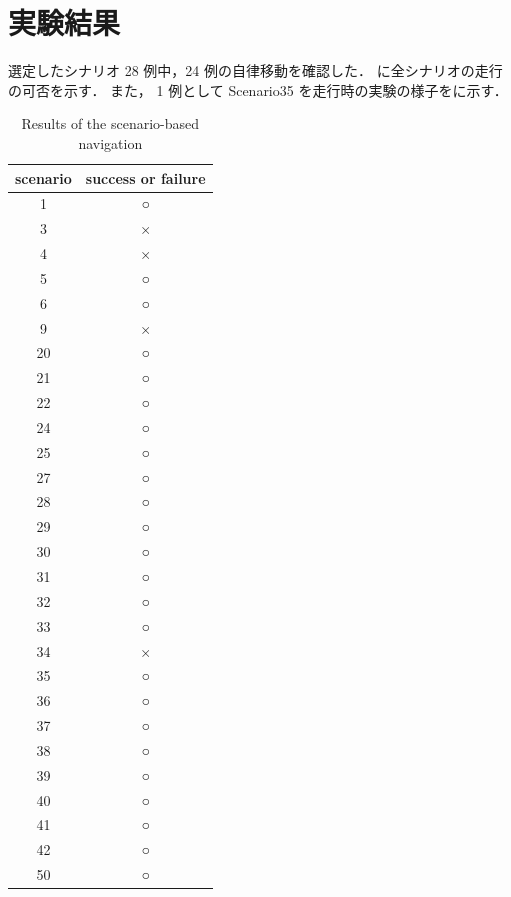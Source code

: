 \newpage
\section{実験結果}
選定したシナリオ 28 例中，24 例の自律移動を確認した．
に全シナリオの走行の可否を示す．
また， 1 例として Scenario35 を走行時の実験の様子をに示す．

\begin{table}[]
    \centering
    \caption{Results of the scenario-based navigation}\label{tab:scenario_result}
    \begin{tabular}{|c|c|}
    \hline
    scenario & success or failure \\ \hline
    1        & ○                  \\ \hline
    3        & ×                  \\ \hline
    4        & ×                  \\ \hline
    5        & ○                  \\ \hline
    6        & ○                  \\ \hline
    9        & ×                  \\ \hline
    20       & ○                  \\ \hline
    21       & ○                  \\ \hline
    22       & ○                  \\ \hline
    24       & ○                  \\ \hline
    25       & ○                  \\ \hline
    27       & ○                  \\ \hline
    28       & ○                  \\ \hline
    29       & ○                  \\ \hline
    30       & ○                  \\ \hline
    31       & ○                  \\ \hline
    32       & ○                  \\ \hline
    33       & ○                  \\ \hline
    34       & ×                  \\ \hline
    35       & ○                  \\ \hline
    36       & ○                  \\ \hline
    37       & ○                  \\ \hline
    38       & ○                  \\ \hline
    39       & ○                  \\ \hline
    40       & ○                  \\ \hline
    41       & ○                  \\ \hline
    42       & ○                  \\ \hline
    50       & ○                  \\ \hline
    \end{tabular}
\end{table}

